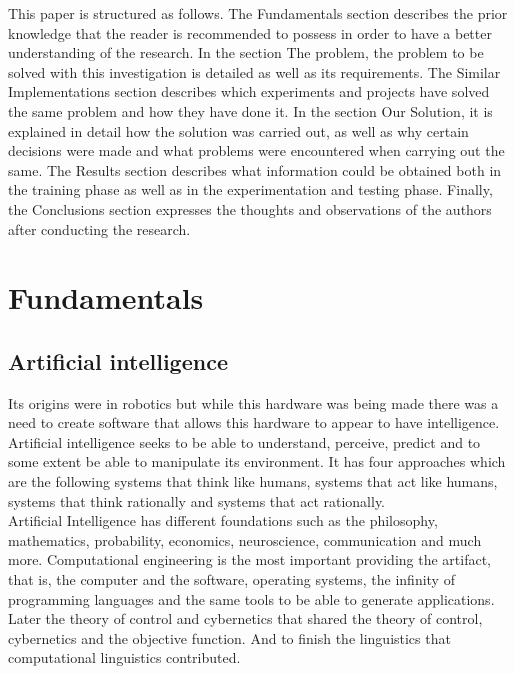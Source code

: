 \documentclass[sigconf,12pt,review=false,natbib=false]{acmart}
\begin{document}
This paper is structured as follows. The Fundamentals section describes the prior knowledge that the
reader is recommended to possess in order to have a better understanding of the research. In the
section The problem, the problem to be solved with this investigation is detailed as well as its
requirements. The Similar Implementations section describes which experiments and projects have
solved the same problem and how they have done it. In the section Our Solution, it is explained in
detail how the solution was carried out, as well as why certain decisions were made and what problems
were encountered when carrying out the same. The Results section describes what information could be
obtained both in the training phase as well as in the experimentation and testing phase. Finally, the
Conclusions section expresses the thoughts and observations of the authors after conducting the
research. \\

\section{Fundamentals}

\subsection{Artificial intelligence}

Its origins were in robotics but while this hardware was being made there was a need to create software that allows
this hardware to appear to have intelligence. Artificial intelligence seeks to be able to understand, perceive,
predict and to some extent be able to manipulate its environment. It has four approaches which are the following
systems that think like humans, systems that act like humans, systems that think rationally and systems that act
rationally. \\

Artificial Intelligence has different foundations such as the philosophy, mathematics, probability, economics,
neuroscience, communication and much more.
Computational engineering is the most important providing the artifact, that is, the computer and the software,
operating systems, the infinity of programming languages and the same tools to be able to generate applications.
Later the theory of control and cybernetics that shared the theory of control, cybernetics and the objective function.
And to finish the linguistics that computational linguistics contributed. \\
\end{document}
